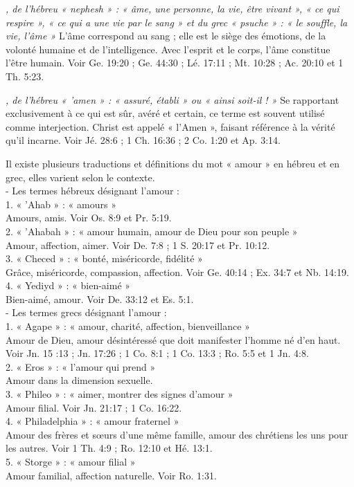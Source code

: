 \begin{multicols}{2}
\textit{, de l'hébreu « nephesh » : « âme, une personne, la vie, être vivant », « ce qui respire », « ce qui a une vie par le sang » et du grec « psuche » : « le souffle, la vie, l'âme »}\newline
L'âme correspond au sang ; elle est le siège des émotions, de la volonté humaine et de l'intelligence. Avec l'esprit et le corps, l'âme constitue l'être humain. Voir Ge. 19:20 ; Ge. 44:30 ; Lé. 17:11 ; Mt. 10:28 ; Ac. 20:10 et 1 Th. 5:23.

\textit{, de l'hébreu « 'amen » : « assuré, établi » ou « ainsi soit-il ! »}\newline
Se rapportant exclusivement à ce qui est sûr, avéré et certain, ce terme est souvent utilisé comme interjection. Christ est appelé « l'Amen », faisant référence à la vérité qu'il incarne. Voir Jé. 28:6 ; 1 Ch. 16:36 ; 2 Co. 1:20 et Ap. 3:14.

\textit{}\newline
Il existe plusieurs traductions et définitions du mot « amour » en hébreu et en grec, elles varient selon le contexte.
\\- Les termes hébreux désignant l'amour :
\\1. « 'Ahab » : « amours »
\\Amours, amis. Voir Os. 8:9 et Pr. 5:19.
\\2. « 'Ahabah » : « amour humain, amour de Dieu pour son peuple »
\\Amour, affection, aimer. Voir De. 7:8 ; 1 S. 20:17 et Pr. 10:12.
\\3. « Checed » : « bonté, miséricorde, fidélité »
\\Grâce, miséricorde, compassion, affection. Voir Ge. 40:14 ; Ex. 34:7 et Nb. 14:19.
\\4. « Yediyd » : « bien-aimé »
\\Bien-aimé, amour. Voir De. 33:12 et Es. 5:1.
\\- Les termes grecs désignant l'amour :
\\1. « Agape » : « amour, charité, affection, bienveillance »
\\Amour de Dieu, amour désintéressé que doit manifester l'homme né d'en haut. Voir Jn. 15 :13 ; Jn. 17:26 ; 1 Co. 8:1 ; 1 Co. 13:3 ; Ro. 5:5 et 1 Jn. 4:8.
\\2. « Eros » : « l'amour qui prend »
\\Amour dans la dimension sexuelle.
\\3. « Phileo » : « aimer, montrer des signes d'amour »
\\Amour filial. Voir Jn. 21:17 ; 1 Co. 16:22.
\\4. « Philadelphia » : « amour fraternel »
\\Amour des frères et sœurs d'une même famille, amour des chrétiens les uns pour les autres. Voir 1 Th. 4:9 ; Ro. 12:10 et Hé. 13:1.
\\5. « Storge » : « amour filial »
\\Amour familial, affection naturelle. Voir Ro. 1:31.


\end{multicols}
